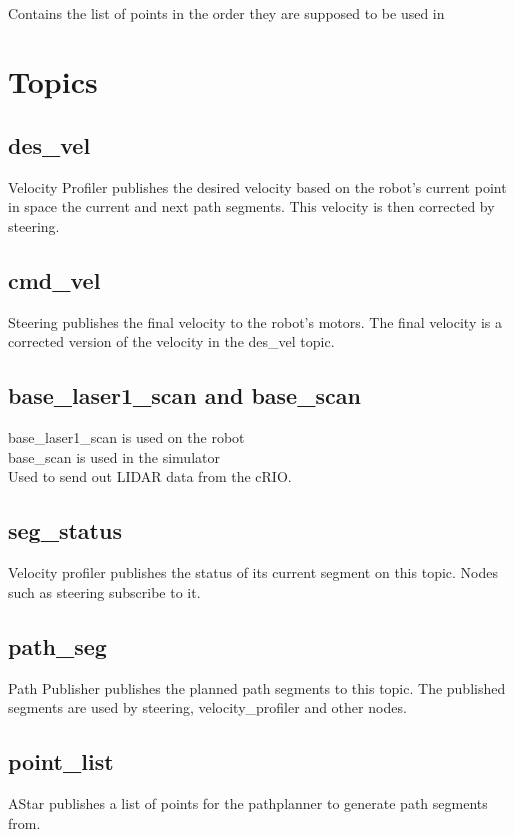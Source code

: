 \\
\indent Contains the list of points in the order they are supposed to be used in\\

\section{Topics}

\subsection{des\_vel}
Velocity Profiler publishes the desired velocity based on the robot's
current point in space the current and next path segments.  This
velocity is then corrected by steering.

\subsection{cmd\_vel}
Steering publishes the final velocity to the robot's motors.  The
final velocity is a corrected version of the velocity in the des\_vel topic.

\subsection{base\_laser1\_scan and base\_scan}
base\_laser1\_scan is used on the robot\\
base\_scan is used in the simulator\\

\noindent Used to send out LIDAR data from the cRIO.

\subsection{seg\_status}
Velocity profiler publishes the status of its current segment on this
topic.  Nodes such as steering subscribe to it.


\subsection{path\_seg}
Path Publisher publishes the planned path segments to this topic.  The
published segments are used by steering, velocity\_profiler and other nodes.

\subsection{point\_list}
AStar publishes a list of points for the pathplanner to generate path segments from.
